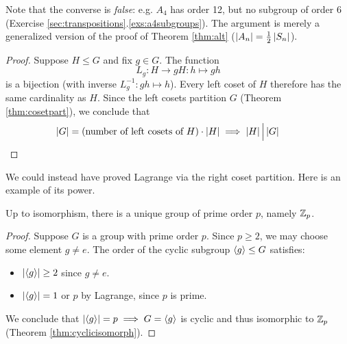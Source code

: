 Note that the converse is \emph{false}: e.g.{} $A_4$ has order 12, but no subgroup of order 6 (Exercise \ref*{sec:transpositions}.\ref{exs:a4subgroups}). The argument is merely a generalized version of the proof of Theorem \ref{thm:alt} ($\left| A_n\right|=\frac 12\left| S_n\right|$).



\begin{proof}
	Suppose $H\le G$ and fix $g\in G$. The function
	\[
		L_g:H\to gH:h\mapsto gh
	\]
	is a bijection (with inverse $L_g^{-1}:gh\mapsto h$). Every left coset of $H$ therefore has the same cardinality as $H$. Since the left cosets partition $G$ (Theorem \ref{thm:cosetpart}), we conclude that
	\[
		\left| G\right|=\text{(number of left cosets of $H$)}\cdot \left| H\right|
		\implies \left| H\right|\Big\vert \left| G\right|
		\tag*{\qedhere}
	\]
\end{proof}


We could instead have proved Lagrange via the right coset partition. Here is an example of its power.

\begin{cor}{}{}
	Up to isomorphism, there is a unique group of prime order $p$, namely $\mathbb{Z}_p$.
\end{cor}

\begin{proof}
	Suppose $G$ is a group with prime order $p$. Since $p\ge 2$, we may choose some element $g\neq e$. The order of the cyclic subgroup $\left\langle g\right\rangle\le G$ satisfies:
	\begin{itemize}%
	  \item $\left| \left\langle g\right\rangle\right|\ge 2$ since $g\neq e$.
	  \item $\left| \left\langle g\right\rangle\right|=1$ or $p$ by Lagrange, since $p$ is prime.
	\end{itemize}
	We conclude that $\left| \left\langle g\right\rangle\right|=p\implies G=\left\langle g\right\rangle$ is cyclic and thus isomorphic to $\mathbb{Z}_p$ (Theorem \ref{thm:cyclicisomorph}).
\end{proof}

